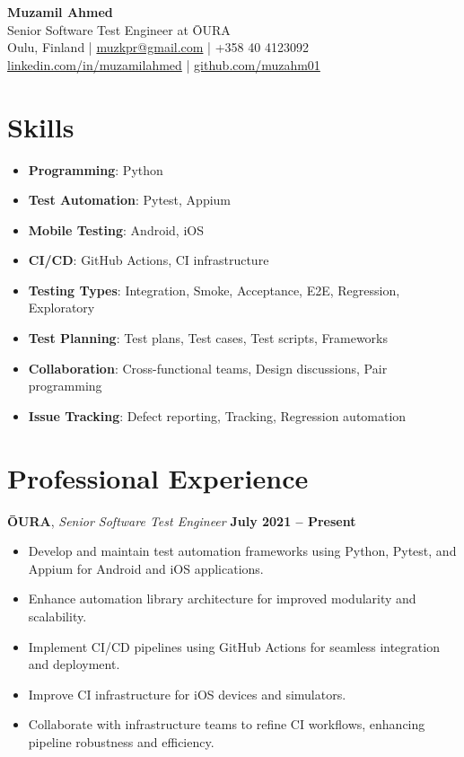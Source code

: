 \documentclass[12pt]{article}
\begin{document}
\begin{center}
    {\LARGE \textbf{Muzamil Ahmed}}\\
    Senior Software Test Engineer at ŌURA \\
    \vspace{0.1cm}
    Oulu, Finland \quad | \quad \href{mailto:muzkpr@gmail.com}{muzkpr@gmail.com} \quad | \quad +358 40 4123092 \\
    \href{https://linkedin.com/in/muzamilahmed}{linkedin.com/in/muzamilahmed} \quad | \quad \href{https://github.com/muzahm01}{github.com/muzahm01}
    \vspace{0.2cm}
\end{center}


\section*{Skills}

\begin{itemize}[leftmargin=1.5em, itemsep=0pt, parsep=0pt, topsep=0pt, partopsep=0pt]
    \item \textbf{Programming}: Python
    \item \textbf{Test Automation}: Pytest, Appium
    \item \textbf{Mobile Testing}: Android, iOS
    \item \textbf{CI/CD}: GitHub Actions, CI infrastructure
    \item \textbf{Testing Types}: Integration, Smoke, Acceptance, E2E, Regression, Exploratory
    \item \textbf{Test Planning}: Test plans, Test cases, Test scripts, Frameworks
    \item \textbf{Collaboration}: Cross-functional teams, Design discussions, Pair programming
    \item \textbf{Issue Tracking}: Defect reporting, Tracking, Regression automation
\end{itemize}


\section*{Professional Experience}

\textbf{ŌURA}, \textit{Senior Software Test Engineer} \hfill \textbf{July 2021 – Present}
\begin{itemize}[leftmargin=1.5em]
    \item Develop and maintain test automation frameworks using Python, Pytest, and Appium for Android and iOS applications.
    \item Enhance automation library architecture for improved modularity and scalability.
    \item Implement CI/CD pipelines using GitHub Actions for seamless integration and deployment.
    \item Improve CI infrastructure for iOS devices and simulators.
    \item Collaborate with infrastructure teams to refine CI workflows, enhancing pipeline robustness and efficiency.
\end{itemize}
\end{document}
